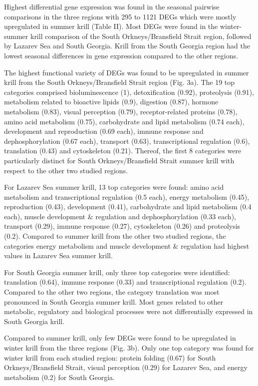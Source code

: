 Highest differential gene expression was found in the seasonal pairwise
comparisons in the three regions with 295 to 1121 DEGs which were mostly
upregulated in summer krill (Table II). Most DEGs were found in the
winter-summer krill comparison of the South Orkneys/Bransfield Strait region,
followed by Lazarev Sea and South Georgia. Krill from the South Georgia region
had the lowest seasonal differences in gene expression compared to the other
regions.

The highest functional variety of DEGs was found to be upregulated in summer
krill from the South Orkneys/Bransfield Strait region (Fig. 3a). The 19 top
categories comprised bioluminescence (1), detoxification (0.92), proteolysis
(0.91), metabolism related to bioactive lipids (0.9), digestion (0.87), hormone
metabolism (0.83), visual perception (0.79),  receptor-related proteins (0.78),
amino acid metabolism (0.75), carbohydrate and lipid metabolism (0.74 each),
development and reproduction (0.69 each), immune response and dephosphorylation
(0.67 each), transport (0.63), transcriptional regulation (0.6), translation
(0.43) and cytoskeleton (0.21). Thereof, the first 8 categories were
particularly distinct for South Orkneys/Bransfield Strait summer krill with
respect to the other two studied regions.

For Lazarev Sea summer krill, 13 top categories were found: amino acid
metabolism and transcriptional regulation (0.5 each), energy metabolism (0.45),
reproduction (0.43), development (0.41), carbohydrate and lipid metabolism (0.4
each), muscle development & regulation and dephosphorylation (0.33 each),
transport (0.29), immune response (0.27), cytoskeleton (0.26) and proteolysis
(0.2). Compared to summer krill from the other two studied  regions, the
categories energy metabolism and muscle development & regulation had highest
values in Lazarev Sea summer krill. 

For South Georgia summer krill, only three top categories were identified:
translation (0.64), immune response (0.33) and transcriptional regulation
(0.2). Compared to the other two regions, the category translation was most
pronounced in South Georgia summer krill. Most genes related to other
metabolic, regulatory and biological processes were not differentially
expressed in South Georgia krill.

Compared to summer krill, only few DEGs were found to be upregulated in winter
krill from the three regions (Fig. 3b).  Only one top category was found for
winter krill from each studied region: protein folding (0.67) for South
Orkneys/Bransfield Strait, visual perception (0.29) for Lazarev Sea, and energy
metabolism (0.2) for South Georgia. 

